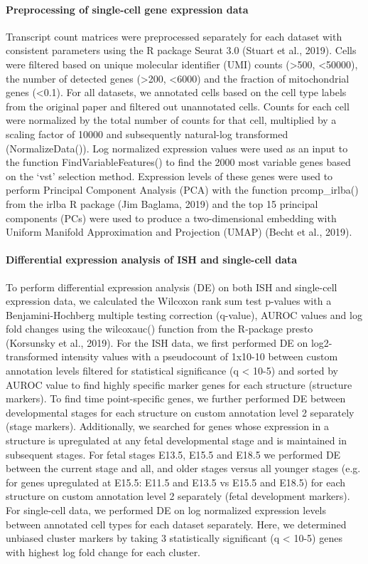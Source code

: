 \paragraph{Preprocessing of single-cell gene expression data}
Transcript count matrices were preprocessed separately for each dataset with consistent parameters using the R package Seurat 3.0 (Stuart et al., 2019). Cells were filtered based on unique molecular identifier (UMI) counts (>500, <50000), the number of detected genes (>200, <6000) and the fraction of mitochondrial genes (<0.1). For all datasets, we annotated cells based on the cell type labels from the original paper and filtered out unannotated cells. Counts for each cell were normalized by the total number of counts for that cell, multiplied by a scaling factor of 10000 and subsequently natural-log transformed (NormalizeData()). Log normalized expression values were used as an input to the function FindVariableFeatures() to find the 2000 most variable genes based on the ‘vst’ selection method. Expression levels of these genes were used to perform Principal Component Analysis (PCA) with the function prcomp\_irlba() from the irlba R package (Jim Baglama, 2019) and the top 15 principal components (PCs) were used to produce a two-dimensional embedding with Uniform Manifold Approximation and Projection (UMAP) (Becht et al., 2019). 

\paragraph{Differential expression analysis of ISH and single-cell data}
To perform differential expression analysis (DE) on both ISH and single-cell expression data, we calculated the Wilcoxon rank sum test p-values with a Benjamini-Hochberg multiple testing correction (q-value), AUROC values and log fold changes using the wilcoxauc() function from the R-package presto (Korsunsky et al., 2019). For the ISH data, we first performed DE on log2-transformed intensity values with a pseudocount of 1x10-10 between custom annotation levels filtered for statistical significance (q < 10-5) and sorted by AUROC value to find highly specific marker genes for each structure (structure markers). To find time point-specific genes, we further performed DE between developmental stages for each structure on custom annotation level 2 separately (stage markers). Additionally, we searched for genes whose expression in a structure is upregulated at any fetal developmental stage and is maintained in subsequent stages. For fetal stages E13.5, E15.5 and E18.5 we performed DE between the current stage and all, and older stages versus all younger stages (e.g. for genes upregulated at E15.5: E11.5 and E13.5 vs E15.5 and E18.5) for each structure on custom annotation level 2 separately (fetal development markers). For single-cell data, we performed DE on log normalized expression levels between annotated cell types for each dataset separately. Here, we determined unbiased cluster markers by taking 3 statistically significant (q < 10-5) genes with highest log fold change for each cluster. 

